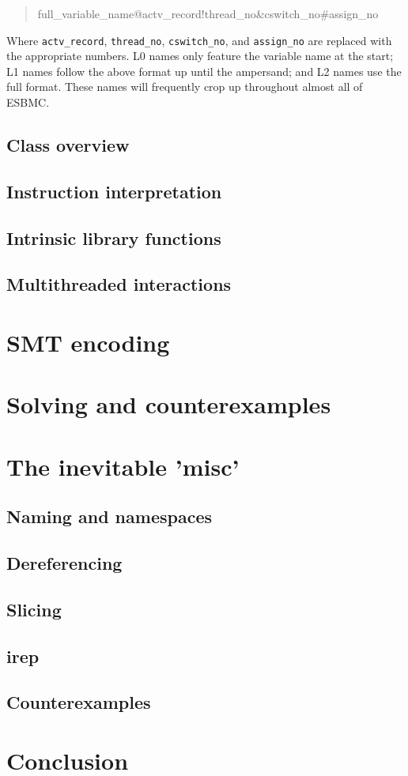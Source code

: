\documentclass{article}
\begin{document}
\begin{quote}
full\_variable\_name@actv\_record!thread\_no\&cswitch\_no\#assign\_no
\end{quote}

Where \texttt{actv\_record}, \texttt{thread\_no}, \texttt{cswitch\_no}, and
\texttt{assign\_no} are replaced with the appropriate numbers. L0 names only
feature the variable name at the start; L1 names follow the above format
up until the ampersand; and L2 names use the full format. These names will
frequently crop up throughout almost all of ESBMC.

\subsection{Class overview}
\subsection{Instruction interpretation}
\subsection{Intrinsic library functions}
\subsection{Multithreaded interactions}

\section{SMT encoding}
\section{Solving and counterexamples}
\section{The inevitable 'misc'}
\subsection{Naming and namespaces}
\subsection{Dereferencing}
\subsection{Slicing}
\subsection{irep}
\subsection{Counterexamples}
\section{Conclusion}
\end{document}

